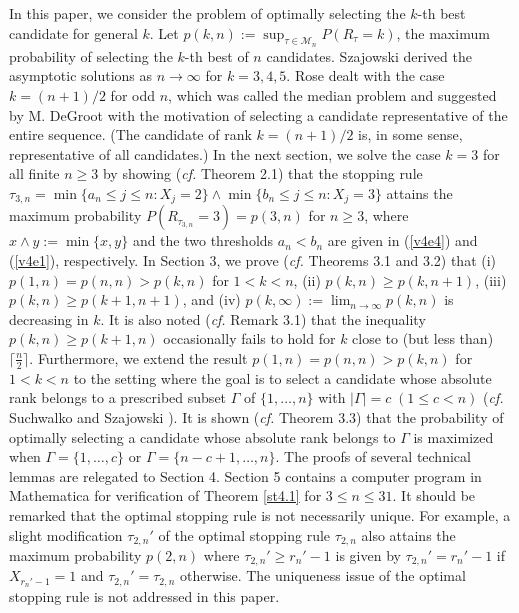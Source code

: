 \documentclass[12pt, A4paper, oneside]{article}
\theoremstyle{plain}
\numberwithin{equation}{section}
\begin{document}
In this paper, we consider the problem of optimally selecting the $k$-th best candidate for general $k$.
Let $p(k,n):=\sup_{\tau \in \mathcal{M}_n} P(R_{\tau}=k)$, the maximum probability of selecting
the $k$-th best of $n$ candidates.   Szajowski \cite{ref26}  derived the asymptotic solutions as $n \to \infty$ for $k=3,4,5$.
Rose \cite{ref24} dealt with the case $k=(n+1)/2$ for odd $n$, which was called the  median problem and suggested by M. DeGroot
with the motivation of selecting a candidate representative of the entire sequence. (The  candidate of rank $k=(n+1)/2$ is, in some sense, representative of
all candidates.)  In the next section, we solve
the case $k=3$ for all finite $n\ge 3$ by showing ({\it cf.} Theorem 2.1) that the stopping rule
$\tau_{3,n}=\min\{a_n \le j \le n: X_j=2\} \wedge \min\{b_n \le j \le n: X_j=3\}$ attains the maximum probability $P(R_{\tau_{3,n}}=3)=p(3,n)$
for $n\ge 3$, where $x \wedge y:=\min\{x,y\}$ and the two thresholds $a_n<b_n$ are given in (\ref{v4e4}) and (\ref{v4e1}), respectively. In Section 3, we prove ({\it cf.} Theorems 3.1 and 3.2)
that (i) $p(1,n)=p(n,n)> p(k,n)$ for $1<k<n$,
(ii)  $p(k,n)\ge p(k,n+1)$, (iii) $p(k,n)\ge p(k+1,n+1)$, and  (iv) $p(k,\infty):=\lim_{n\to \infty} p(k,n)$ is decreasing in $k$. It is also noted
({\it cf.} Remark 3.1) that  the inequality
$p(k,n)\ge p(k+1,n)$ occasionally fails to hold for $k$ close to (but less than) $\lceil\frac{n}{2}\rceil$.
Furthermore, we extend  the result $p(1,n)=p(n,n)>p(k,n)$ for $1<k<n$
to the setting where the goal is to select a candidate whose absolute rank belongs to a prescribed subset $\Gamma$ of $\{1,\dots,n\}$
with $|\Gamma|=c \;(1\le c<n)$ ({\it cf.} Suchwalko and Szajowski \cite{ref25}). It is shown ({\it cf.} Theorem 3.3) that the probability of optimally selecting a candidate whose absolute rank belongs to $\Gamma$
is maximized when $\Gamma=\{1,\dots,c\}$ or $\Gamma=\{n-c+1,\dots,n\}$.
The proofs of several technical lemmas are
relegated to Section 4. Section 5 contains a computer program in Mathematica for verification of Theorem \ref{st4.1} for $3\le n\le 31$. It should be remarked that the optimal stopping rule is not necessarily unique. For example, a slight modification $\tau_{2,n}'$ of the optimal stopping rule $\tau_{2,n}$ also attains the maximum probability $p(2,n)$ where $\tau_{2,n}'\ge r_n'-1$ is given by $\tau_{2,n}'=r_n'-1$ if $X_{r_n'-1}=1$ and $\tau_{2,n}'=\tau_{2,n}$ otherwise.
The uniqueness issue of the optimal stopping rule is not addressed in this paper.
\end{document}
